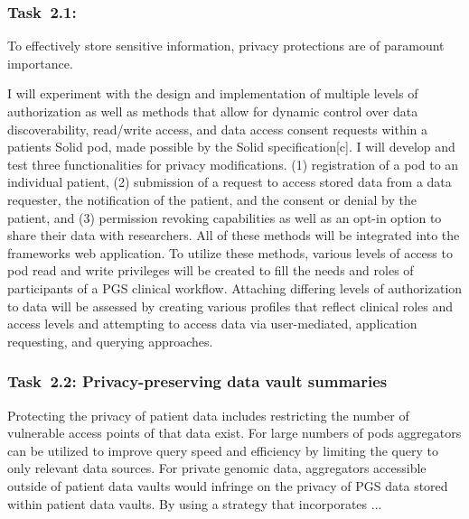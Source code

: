 \documentclass[a4paper,11pt]{article}
\begin{document}
\begin{refsection}
\subsubsection{Task~2.1: \WPba}
To effectively store sensitive information, privacy protections are of paramount importance. 

I will experiment with the design and implementation of multiple levels of authorization as well as methods that allow for dynamic control over data discoverability, read/write access, and data access consent requests within a patient\textquotesingle s Solid pod, made possible by the Solid specification[c]. 
I will develop and test three functionalities for privacy modifications.
(1) registration of a pod to an individual patient,
(2) submission of a request to access stored data from a data requester, the notification of the patient, and the consent or denial by the patient, and
(3) permission revoking capabilities as well as an opt-in option to share their data with researchers. 
All of these methods will be integrated into the framework\textquotesingle s web application.
To utilize these methods, various levels of access to pod read and write privileges will be created to fill the needs and roles of participants of a PGS clinical workflow. 
Attaching differing levels of authorization to data will be assessed by creating various profiles that reflect clinical roles and access levels and attempting to access data via user-mediated, application requesting, and querying approaches. 


\newcommand\WPbb{Privacy-preserving data vault summaries}
\subsubsection{Task~2.2: \WPbb}

Protecting the privacy of patient data includes restricting the number of vulnerable access points of that data exist.
For large numbers of pods aggregators can be utilized to improve query speed and efficiency by limiting the query to only relevant data sources.
For private genomic data, aggregators accessible outside of patient data vaults would infringe on the privacy of PGS data stored within patient data vaults.
By using a strategy that incorporates ...


\end{refsection}
\end{document}
